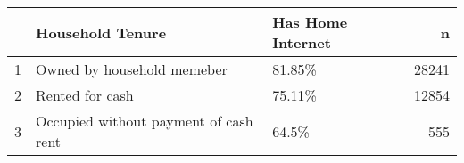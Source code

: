 \begin{table}[ht]
\centering
\begin{tabular}{rllr}
  \hline
 & Household Tenure & Has Home Internet & n \\ 
  \hline
1 & Owned by household memeber & 81.85\% & 28241 \\ 
  2 & Rented for cash & 75.11\% & 12854 \\ 
  3 & Occupied without payment of cash rent & 64.5\% & 555 \\ 
   \hline
\end{tabular}
\end{table}
